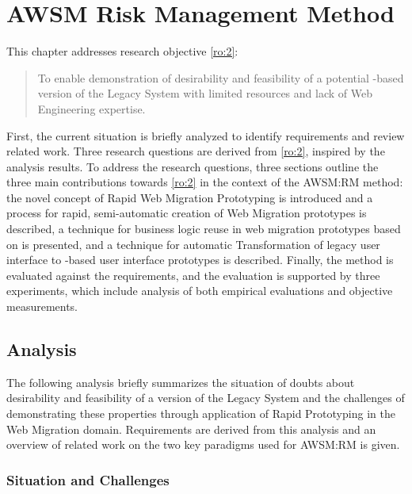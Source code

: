 \hypertarget{sec:awsm-rm}{%
\chapter{AWSM Risk Management Method}\label{sec:awsm-rm}}

This chapter addresses research objective \cref{ro:2}:

\begin{quote}
To enable demonstration of desirability and feasibility of a potential -based version of the \gls{Legacy System} with limited resources and lack of \gls{Web Engineering} expertise.
\end{quote}

First, the current situation is briefly analyzed to identify requirements and review related work.
Three research questions are derived from \cref{ro:2}, inspired by the analysis results. 
To address the research questions, three sections outline the three main contributions towards \cref{ro:2} in the context of the AWSM:RM method: the novel concept of \gls{Rapid Web Migration Prototyping} is introduced and a process for rapid, semi-automatic creation of \gls{Web Migration} prototypes is described, a technique for business logic reuse in \glspl{web migration prototype} based on  is presented, and a technique for automatic \gls{Transformation} of legacy user interface to -based user interface prototypes is described.
Finally, the method is evaluated against the requirements, and the evaluation is supported by three experiments, which include analysis of both empirical evaluations and objective measurements.

\hypertarget{sec:rm.analysis}{%
\section{Analysis}\label{sec:rm.analysis}}
\vspace{15pt}

The following analysis briefly summarizes the situation of doubts about desirability and feasibility of a \webbased version of the \gls{Legacy System} and the challenges of demonstrating these properties through application of \gls{Rapid Prototyping} in the \gls{Web Migration} domain.
Requirements are derived from this analysis and an overview of related work on the two key paradigms used for AWSM:RM is given.

\vspace{-15pt}
\subsection{Situation and Challenges}
\vspace{10pt}

